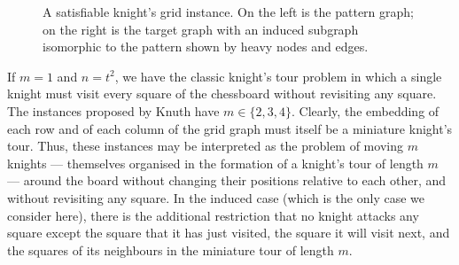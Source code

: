 \begin{figure}[htb]
    \centering
    \caption{A satisfiable knight's grid instance. On the left is the pattern graph; on the right
            is the target graph with an induced subgraph isomorphic to the pattern shown by heavy
            nodes and edges.}\label{figure:knights-example}
\end{figure}

If $m=1$ and $n=t^2$, we have the classic knight's tour problem in which a single knight
must visit every square of the chessboard without revisiting any square.  The instances proposed
by Knuth have $m \in \{2,3,4\}$.
Clearly, the embedding of each row and of each column of the grid graph must itself be a miniature
knight's tour.
Thus, these instances may be interpreted as the problem of moving $m$
knights --- themselves organised in the formation of a knight's tour of length $m$ ---
around the board without changing their positions relative to each other, and without revisiting
any square.  In the induced case (which is the only case we consider here), there
is the additional restriction that no knight attacks any square except the square that it has
just visited, the square it will visit next, and the squares of its neighbours in the miniature
tour of length $m$.


